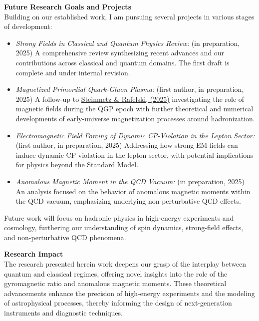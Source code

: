 \documentclass[11pt]{article}
\begin{document}
{\noindent\Large\textbf{Future Research Goals and Projects}}\\
Building on our established work, I am pursuing several projects in various stages of development:
\begin{itemize}[leftmargin=1.5em,nosep]
    \item \emph{Strong Fields in Classical and Quantum Physics Review:} (in preparation, 2025) A comprehensive review synthesizing recent advances and our contributions across classical and quantum domains. The first draft is complete and under internal revision.
    \item \emph{Magnetized Primordial Quark-Gluon Plasma:} (first author, in preparation, 2025) A follow-up to \href{https://doi.org/10.48550/arXiv.2502.05052}{Steinmetz \& Rafelski, (2025)} investigating the role of magnetic fields during the QGP epoch with further theoretical and numerical developments of early-universe magnetization processes around hadronization.
    \item \emph{Electromagnetic Field Forcing of Dynamic CP-Violation in the Lepton Sector:} (first author, in preparation, 2025) Addressing how strong EM fields can induce dynamic CP-violation in the lepton sector, with potential implications for physics beyond the Standard Model.
    \item \emph{Anomalous Magnetic Moment in the QCD Vacuum:} (in preparation, 2025) An analysis focused on the behavior of anomalous magnetic moments within the QCD vacuum, emphasizing underlying non-perturbative QCD effects.
\end{itemize}
Future work will focus on hadronic physics in high-energy experiments and cosmology, furthering our understanding of spin dynamics, strong-field effects, and non-perturbative QCD phenomena.

\vspace{1em}

{\noindent\Large\textbf{Research Impact}}\\
The research presented herein work deepens our grasp of the interplay between quantum and classical regimes, offering novel insights into the role of the gyromagnetic ratio and anomalous magnetic moments. These theoretical advancements enhance the precision of high-energy experiments and the modeling of astrophysical processes, thereby informing the design of next-generation instruments and diagnostic techniques.

\newpage
\end{document}

